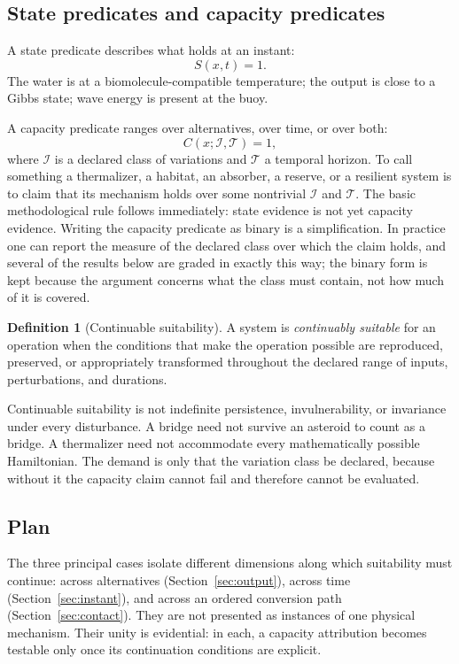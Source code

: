 \documentclass[11pt]{article}
\theoremstyle{definition}
\newtheorem{definition}{Definition}
\newcommand{\Iset}{\mathcal I}
\newcommand{\Tset}{\mathcal T}
\begin{document}
\subsection{State predicates and capacity predicates}

A state predicate describes what holds at an instant:
\begin{equation}
S(x,t)=1 .
\end{equation}
The water is at a biomolecule-compatible temperature; the output is close to a Gibbs state; wave energy is present at the buoy.

A capacity predicate ranges over alternatives, over time, or over both:
\begin{equation}
C(x;\Iset,\Tset)=1,
\end{equation}
where $\Iset$ is a declared class of variations and $\Tset$ a temporal horizon. To call something a thermalizer, a habitat, an absorber, a reserve, or a resilient system is to claim that its mechanism holds over some nontrivial $\Iset$ and $\Tset$. The basic methodological rule follows immediately: state evidence is not yet capacity evidence. Writing the capacity predicate as binary is a simplification. In practice one can report the measure of the declared class over which the claim holds, and several of the results below are graded in exactly this way; the binary form is kept because the argument concerns what the class must contain, not how much of it is covered.

\begin{definition}[Continuable suitability]
A system is \emph{continuably suitable} for an operation when the conditions that make the operation possible are reproduced, preserved, or appropriately transformed throughout the declared range of inputs, perturbations, and durations.
\end{definition}

Continuable suitability is not indefinite persistence, invulnerability, or invariance under every disturbance. A bridge need not survive an asteroid to count as a bridge. A thermalizer need not accommodate every mathematically possible Hamiltonian. The demand is only that the variation class be declared, because without it the capacity claim cannot fail and therefore cannot be evaluated.

\subsection{Plan}

The three principal cases isolate different dimensions along which suitability must continue: across alternatives (Section~\ref{sec:output}), across time (Section~\ref{sec:instant}), and across an ordered conversion path (Section~\ref{sec:contact}). They are not presented as instances of one physical mechanism. Their unity is evidential: in each, a capacity attribution becomes testable only once its continuation conditions are explicit.
\end{document}
